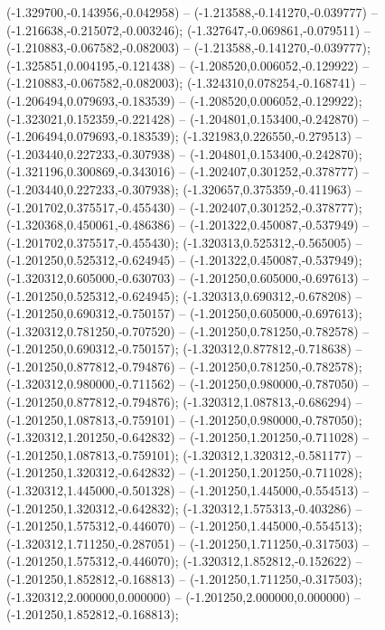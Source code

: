  (-1.329700,-0.143956,-0.042958) -- (-1.213588,-0.141270,-0.039777) -- (-1.216638,-0.215072,-0.003246);
 (-1.327647,-0.069861,-0.079511) -- (-1.210883,-0.067582,-0.082003) -- (-1.213588,-0.141270,-0.039777);
 (-1.325851,0.004195,-0.121438) -- (-1.208520,0.006052,-0.129922) -- (-1.210883,-0.067582,-0.082003);
 (-1.324310,0.078254,-0.168741) -- (-1.206494,0.079693,-0.183539) -- (-1.208520,0.006052,-0.129922);
 (-1.323021,0.152359,-0.221428) -- (-1.204801,0.153400,-0.242870) -- (-1.206494,0.079693,-0.183539);
 (-1.321983,0.226550,-0.279513) -- (-1.203440,0.227233,-0.307938) -- (-1.204801,0.153400,-0.242870);
 (-1.321196,0.300869,-0.343016) -- (-1.202407,0.301252,-0.378777) -- (-1.203440,0.227233,-0.307938);
 (-1.320657,0.375359,-0.411963) -- (-1.201702,0.375517,-0.455430) -- (-1.202407,0.301252,-0.378777);
 (-1.320368,0.450061,-0.486386) -- (-1.201322,0.450087,-0.537949) -- (-1.201702,0.375517,-0.455430);
 (-1.320313,0.525312,-0.565005) -- (-1.201250,0.525312,-0.624945) -- (-1.201322,0.450087,-0.537949);
 (-1.320312,0.605000,-0.630703) -- (-1.201250,0.605000,-0.697613) -- (-1.201250,0.525312,-0.624945);
 (-1.320313,0.690312,-0.678208) -- (-1.201250,0.690312,-0.750157) -- (-1.201250,0.605000,-0.697613);
 (-1.320312,0.781250,-0.707520) -- (-1.201250,0.781250,-0.782578) -- (-1.201250,0.690312,-0.750157);
 (-1.320312,0.877812,-0.718638) -- (-1.201250,0.877812,-0.794876) -- (-1.201250,0.781250,-0.782578);
 (-1.320312,0.980000,-0.711562) -- (-1.201250,0.980000,-0.787050) -- (-1.201250,0.877812,-0.794876);
 (-1.320312,1.087813,-0.686294) -- (-1.201250,1.087813,-0.759101) -- (-1.201250,0.980000,-0.787050);
 (-1.320312,1.201250,-0.642832) -- (-1.201250,1.201250,-0.711028) -- (-1.201250,1.087813,-0.759101);
 (-1.320312,1.320312,-0.581177) -- (-1.201250,1.320312,-0.642832) -- (-1.201250,1.201250,-0.711028);
 (-1.320312,1.445000,-0.501328) -- (-1.201250,1.445000,-0.554513) -- (-1.201250,1.320312,-0.642832);
 (-1.320312,1.575313,-0.403286) -- (-1.201250,1.575312,-0.446070) -- (-1.201250,1.445000,-0.554513);
 (-1.320312,1.711250,-0.287051) -- (-1.201250,1.711250,-0.317503) -- (-1.201250,1.575312,-0.446070);
 (-1.320312,1.852812,-0.152622) -- (-1.201250,1.852812,-0.168813) -- (-1.201250,1.711250,-0.317503);
 (-1.320312,2.000000,0.000000) -- (-1.201250,2.000000,0.000000) -- (-1.201250,1.852812,-0.168813);
